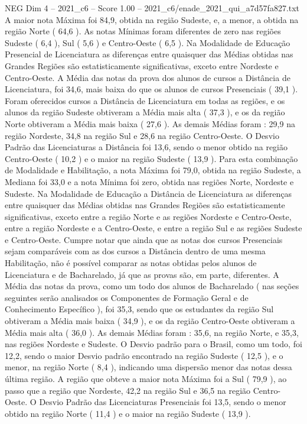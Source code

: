 \begin{textsample}{NEG Dim 4 – 2021\_c6 – Score 1.00 – 2021\_c6/enade\_2021\_qui\_a7d57fa827.txt}
A maior nota Máxima foi 84,9, obtida na região Sudeste, e, a menor, a obtida na região Norte ( 64,6 ).
As notas Mínimas foram diferentes de zero nas regiões Sudeste ( 6,4 ), Sul ( 5,6 ) e Centro-Oeste ( 6,5 ).
Na Modalidade de Educação Presencial de Licenciatura as diferenças entre quaisquer das Médias obtidas nas Grandes Regiões são estatisticamente significativas, exceto entre Nordeste e Centro-Oeste.
A Média das notas da prova dos alunos de cursos a Distância de Licenciatura, foi 34,6, mais baixa do que os alunos de cursos Presenciais ( 39,1 ).
Foram oferecidos cursos a Distância de Licenciatura em todas as regiões, e os alunos da região Sudeste obtiveram a Média mais alta ( 37,3 ), e os da região Norte obtiveram a Média mais baixa ( 27,6 ).
As demais Médias foram : 29,9 na região Nordeste, 34,8 na região Sul e 28,6 na região Centro-Oeste.
O Desvio Padrão das Licenciaturas a Distância foi 13,6, sendo o menor obtido na região Centro-Oeste ( 10,2 ) e o maior na região Sudeste ( 13,9 ).
Para esta combinação de Modalidade e Habilitação, a nota Máxima foi 79,0, obtida na região Sudeste, a Mediana foi 33,0 e a nota Mínima foi zero, obtida nas regiões Norte, Nordeste e Sudeste.
Na Modalidade de Educação a Distância de Licenciatura as diferenças entre quaisquer das Médias obtidas nas Grandes Regiões são estatisticamente significativas, exceto entre a região Norte e as regiões Nordeste e Centro-Oeste, entre a região Nordeste e a Centro-Oeste, e entre a região Sul e as regiões Sudeste e Centro-Oeste.
Cumpre notar que ainda que as notas dos cursos Presenciais sejam comparáveis com as dos cursos a Distância dentro de uma mesma Habilitação, não é possível comparar as notas obtidas pelos alunos de Licenciatura e de Bacharelado, já que as provas são, em parte, diferentes.
A Média das notas da prova, como um todo dos alunos de Bacharelado ( nas seções seguintes serão analisados os Componentes de Formação Geral e de Conhecimento Específico ), foi 35,3, sendo que os estudantes da região Sul obtiveram a Média mais baixa ( 34,9 ), e os da região Centro-Oeste obtiveram a Média mais alta ( 36,0 ).
As demais Médias foram : 35,6, na região Norte, e 35,3, nas regiões Nordeste e Sudeste.
O Desvio padrão para o Brasil, como um todo, foi 12,2, sendo o maior Desvio padrão encontrado na região Sudeste ( 12,5 ), e o menor, na região Norte ( 8,4 ), indicando uma dispersão menor das notas dessa última região.
A região que obteve a maior nota Máxima foi a Sul ( 79,9 ), ao passo que a região que Nordeste, 42,2 na região Sul e 36,5 na região Centro-Oeste.
O Desvio Padrão das Licenciaturas Presenciais foi 13,5, sendo o menor obtido na região Norte ( 11,4 ) e o maior na região Sudeste ( 13,9 ).

\end{textsample}
